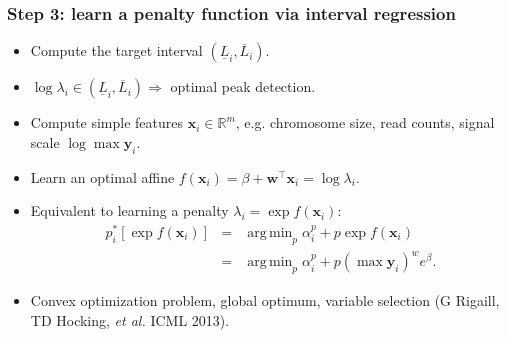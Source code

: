 \documentclass{beamer}
\DeclareMathOperator*{\argmin}{arg\,min}
\DeclareMathOperator*{\minimize}{minimize}
\newcommand{\RR}{\mathbb R}
\begin{document}
\begin{frame}
  \frametitle{Step 3: learn a penalty function via interval regression}
  \begin{itemize}
  \item Compute the target interval $(\underline L_i, \overline
    L_i)$.
  \item $\log \lambda_i\in(\underline L_i, \overline L_i) \Rightarrow$
   optimal peak detection.
  \item Compute simple features $\mathbf x_i\in\RR^m$, e.g. chromosome size,
    read counts, signal scale $\log \max \mathbf y_i $.
  \item Learn an optimal affine $f(\mathbf x_i) =
    \beta + \mathbf w^\intercal \mathbf x_i = \log \lambda_i $.
  \item Equivalent to learning a penalty $\lambda_i = \exp
    f(\mathbf x_i)$:
    \begin{eqnarray*}
  p_i^*[\exp f(\mathbf x_i)] 
&=& \argmin_p  \alpha_i^p +  p \exp f(\mathbf x_i) \\
&=& \argmin_p \alpha_i^p + p (\max \mathbf y_i)^w e^\beta.
\end{eqnarray*}
  \item Convex optimization problem, global optimum, variable
    selection (G Rigaill, TD Hocking, \emph{et al.} ICML 2013).
  \end{itemize}
\end{frame}
\end{document}
